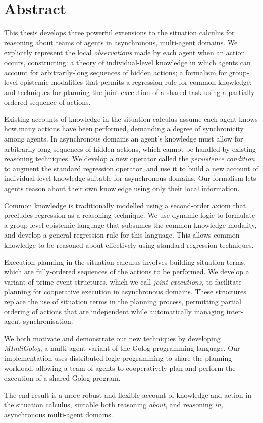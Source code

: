 


\chapter*{Abstract}

This thesis develops three powerful extensions to the situation
calculus for reasoning about teams of agents in asynchronous, multi-agent
domains. We explicitly represent the local \emph{observations} made
by each agent when an action occurs, constructing: a theory of individual-level
knowledge in which agents can account for arbitrarily-long sequences
of hidden actions; a formalism for group-level epistemic modalities
that permits a regression rule for common knowledge; and techniques
for planning the joint execution of a shared task using a partially-ordered
sequence of actions.

Existing accounts of knowledge in the situation calculus assume each
agent knows how many actions have been performed, demanding a degree
of synchronicity among agents. In asynchronous domains an agent's
knowledge must allow for arbitrarily-long sequences of hidden actions,
which cannot be handled by existing reasoning techniques. We develop
a new operator called the \emph{persistence condition} to augment
the standard regression operator, and use it to build a new account
of individual-level knowledge suitable for asynchronous domains. Our
formalism lets agents reason about their own knowledge using only
their local information.

Common knowledge is traditionally modelled using a second-order axiom
that precludes regression as a reasoning technique. We use dynamic
logic to formulate a group-level epistemic language that
subsumes the common knowledge modality, and develop a general
regression rule for this language. This allows common knowledge to
be reasoned about effectively using standard regression techniques.

Execution planning in the situation calculus involves building situation
terms, which are fully-ordered sequences of the actions to be performed.
We develop a variant of prime event structures, which we call \emph{joint
executions,} to facilitate planning for cooperative execution in asynchronous
domains. These structures replace the use of situation terms in the
planning process, permitting partial ordering of actions that are
independent while automatically managing inter-agent synchronisation.

We both motivate and demonstrate our new techniques by developing
\emph{MIndiGolog}, a multi-agent variant of the Golog programming
language. Our implementation uses distributed logic programming to
share the planning workload, allowing a team of agents to cooperatively
plan and perform the execution of a shared Golog program.

The end result is a more robust and flexible account of knowledge
and action in the situation calculus, suitable both reasoning \emph{about},
and reasoning \emph{in,} asynchronous multi-agent domains.

